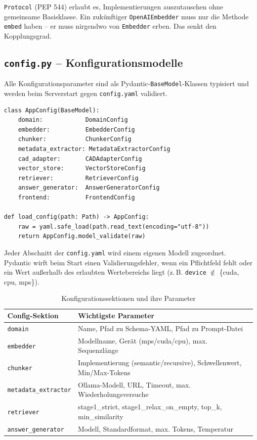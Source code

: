\documentclass[12pt, a4paper]{article}
\begin{document}
\begin{infobox}
\texttt{Protocol} (PEP 544) erlaubt es, Implementierungen auszutauschen ohne gemeinsame
Basisklasse. Ein zukünftiger \texttt{OpenAIEmbedder} muss nur die Methode \texttt{embed}
haben -- er muss nirgendwo von \texttt{Embedder} erben. Das senkt den Kopplungsgrad.
\end{infobox}

\subsection{\texttt{config.py} -- Konfigurationsmodelle}

Alle Konfigurationsparameter sind als Pydantic-\texttt{BaseModel}-Klassen typisiert und
werden beim Serverstart gegen \texttt{config.yaml} validiert.

\begin{lstlisting}[style=pythonstyle, caption={Konfigurationsstruktur (config.py)}]
class AppConfig(BaseModel):
    domain:            DomainConfig
    embedder:          EmbedderConfig
    chunker:           ChunkerConfig
    metadata_extractor: MetadataExtractorConfig
    cad_adapter:       CADAdapterConfig
    vector_store:      VectorStoreConfig
    retriever:         RetrieverConfig
    answer_generator:  AnswerGeneratorConfig
    frontend:          FrontendConfig

def load_config(path: Path) -> AppConfig:
    raw = yaml.safe_load(path.read_text(encoding="utf-8"))
    return AppConfig.model_validate(raw)
\end{lstlisting}

Jeder Abschnitt der \texttt{config.yaml} wird einem eigenen Modell zugeordnet. Pydantic
wirft beim Start einen Validierungsfehler, wenn ein Pflichtfeld fehlt oder ein Wert
außerhalb des erlaubten Wertebereichs liegt (z.\,B. \texttt{device} $\notin$ \{cuda, cpu, mps\}).

\vspace{0.5em}
\begin{table}[H]
\centering
\small
\begin{tabularx}{\textwidth}{lX}
\toprule
\textbf{Config-Sektion} & \textbf{Wichtigste Parameter} \\
\midrule
\texttt{domain} & Name, Pfad zu Schema-YAML, Pfad zu Prompt-Datei \\
\texttt{embedder} & Modellname, Gerät (mps/cuda/cpu), max. Sequenzlänge \\
\texttt{chunker} & Implementierung (semantic/recursive), Schwellenwert, Min/Max-Tokens \\
\texttt{metadata\_extractor} & Ollama-Modell, URL, Timeout, max. Wiederholungsversuche \\
\texttt{retriever} & stage1\_strict, stage1\_relax\_on\_empty, top\_k, min\_similarity \\
\texttt{answer\_generator} & Modell, Standardformat, max. Tokens, Temperatur \\
\bottomrule
\end{tabularx}
\caption{Konfigurationssektionen und ihre Parameter}
\end{table}
\end{document}
